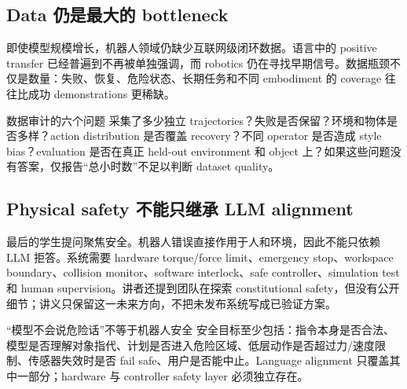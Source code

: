 \documentclass[a4paper]{article}
\begin{document}

\subsection{Data 仍是最大的 bottleneck}

即使模型规模增长，机器人领域仍缺少互联网级闭环数据。语言中的 positive transfer 已经普遍到不再被单独强调，而 robotics 仍在寻找早期信号。数据瓶颈不仅是数量：失败、恢复、危险状态、长期任务和不同 embodiment 的 coverage 往往比成功 demonstrations 更稀缺。

\begin{knowledgebox}{数据审计的六个问题}
采集了多少独立 trajectories？失败是否保留？环境和物体是否多样？action distribution 是否覆盖 recovery？不同 operator 是否造成 style bias？evaluation 是否在真正 held-out environment 和 object 上？如果这些问题没有答案，仅报告“总小时数”不足以判断 dataset quality。
\end{knowledgebox}

\subsection{Physical safety 不能只继承 LLM alignment}

最后的学生提问聚焦安全。机器人错误直接作用于人和环境，因此不能只依赖 LLM 拒答。系统需要 hardware torque/force limit、emergency stop、workspace boundary、collision monitor、software interlock、safe controller、simulation test 和 human supervision。讲者还提到团队在探索 constitutional safety，但没有公开细节；讲义只保留这一未来方向，不把未发布系统写成已验证方案。

\begin{warningbox}{“模型不会说危险话”不等于机器人安全}
安全目标至少包括：指令本身是否合法、模型是否理解对象指代、计划是否进入危险区域、低层动作是否超过力/速度限制、传感器失效时是否 fail safe、用户是否能中止。Language alignment 只覆盖其中一部分；hardware 与 controller safety layer 必须独立存在。
\end{warningbox}

\end{document}
